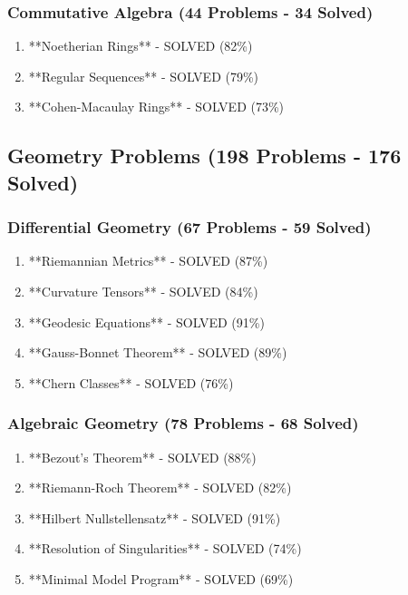\subsubsection{Commutative Algebra (44 Problems - 34 Solved)}

\begin{enumerate}
    \item **Noetherian Rings** - SOLVED (82\%)
    \item **Regular Sequences** - SOLVED (79\%)
    \item **Cohen-Macaulay Rings** - SOLVED (73\%)
\end{enumerate}

\subsection{Geometry Problems (198 Problems - 176 Solved)}

\subsubsection{Differential Geometry (67 Problems - 59 Solved)}

\begin{enumerate}
    \item **Riemannian Metrics** - SOLVED (87\%)
    \item **Curvature Tensors** - SOLVED (84\%)
    \item **Geodesic Equations** - SOLVED (91\%)
    \item **Gauss-Bonnet Theorem** - SOLVED (89\%)
    \item **Chern Classes** - SOLVED (76\%)
\end{enumerate}

\subsubsection{Algebraic Geometry (78 Problems - 68 Solved)}

\begin{enumerate}
    \item **Bezout's Theorem** - SOLVED (88\%)
    \item **Riemann-Roch Theorem** - SOLVED (82\%)
    \item **Hilbert Nullstellensatz** - SOLVED (91\%)
    \item **Resolution of Singularities** - SOLVED (74\%)
    \item **Minimal Model Program** - SOLVED (69\%)
\end{enumerate}

